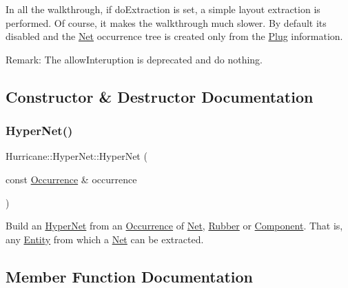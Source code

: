 In all the walkthrough, if {\ttfamily do\+Extraction} is set, a simple layout extraction is performed. Of course, it makes the walkthrough much slower. By default it\textquotesingle{}s disabled and the \mbox{\hyperlink{classHurricane_1_1Net}{Net}} occurrence tree is created only from the \mbox{\hyperlink{classHurricane_1_1Plug}{Plug}} information.

\begin{DoxyParagraph}{Remark\+: The {\ttfamily allow\+Interuption} is deprecated and do nothing.}

\end{DoxyParagraph}


\subsection{Constructor \& Destructor Documentation}
\mbox{\label{classHurricane_1_1HyperNet_a30bdc04b4dece8bdef66361fe4469175}} 
\subsubsection{\texorpdfstring{Hyper\+Net()}{HyperNet()}}
{\footnotesize\ttfamily Hurricane\+::\+Hyper\+Net\+::\+Hyper\+Net (\begin{DoxyParamCaption}\item[{const \mbox{\hyperlink{classHurricane_1_1Occurrence}{Occurrence}} \&}]{occurrence }\end{DoxyParamCaption})}

Build an \mbox{\hyperlink{classHurricane_1_1HyperNet}{Hyper\+Net}} from an \mbox{\hyperlink{classHurricane_1_1Occurrence}{Occurrence}} of \mbox{\hyperlink{classHurricane_1_1Net}{Net}}, \mbox{\hyperlink{classHurricane_1_1Rubber}{Rubber}} or \mbox{\hyperlink{classHurricane_1_1Component}{Component}}. That is, any \mbox{\hyperlink{classHurricane_1_1Entity}{Entity}} from which a \mbox{\hyperlink{classHurricane_1_1Net}{Net}} can be extracted. 

\subsection{Member Function Documentation}
\mbox{\label{classHurricane_1_1HyperNet_a327eab6dda243836becde745bfc53efa}} 
